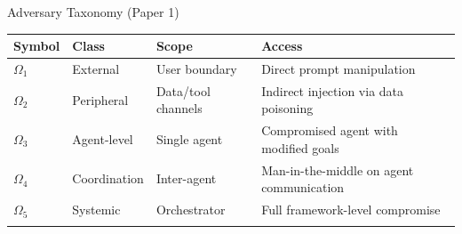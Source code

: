\documentclass[
  ignorenonframetext,
]{beamer}
\newcounter{none} %
\begin{document}
\begin{frame}[allowframebreaks]{Adversary Taxonomy (Paper 1)}
\protect{}\label{adversary-taxonomy-paper-1}
{\def\LTcaptype{none} %
\begin{longtable}[]{@{}
  >{\raggedright\arraybackslash}p{}
  >{\raggedright\arraybackslash}p{}
  >{\raggedright\arraybackslash}p{}
  >{\raggedright\arraybackslash}p{}@{}}
\toprule\noalign{}
\begin{minipage}[b]{\linewidth}\raggedright
Symbol
\end{minipage} & \begin{minipage}[b]{\linewidth}\raggedright
Class
\end{minipage} & \begin{minipage}[b]{\linewidth}\raggedright
Scope
\end{minipage} & \begin{minipage}[b]{\linewidth}\raggedright
Access
\end{minipage} \\
\midrule\noalign{}
\endhead
\(\Omega_1\) & External & User boundary & Direct prompt manipulation \\
\(\Omega_2\) & Peripheral & Data/tool channels & Indirect injection via
data poisoning \\
\(\Omega_3\) & Agent-level & Single agent & Compromised agent with
modified goals \\
\(\Omega_4\) & Coordination & Inter-agent & Man-in-the-middle on agent
communication \\
\(\Omega_5\) & Systemic & Orchestrator & Full framework-level
compromise \\
\bottomrule\noalign{}
\end{longtable}
}
\end{frame}
\end{document}
